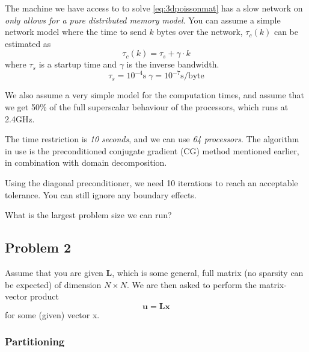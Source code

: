 \begin{question}
  The machine we have access to to solve \eqref{eq:3dpoissonmat} has a slow network on \emph{only allows for a pure distributed memory model}. You can assume a simple network model where the time to send $k$ bytes over the network, $\tau_c(k)$ can be estimated as
  \begin{equation}
    \tau_c(k) = \tau_s + \gamma \cdot k
  \end{equation}
  where $\tau_s$ is a startup time and $\gamma$ is the inverse bandwidth.
  \[
    \tau_s = 10^{-4}\mathrm{s} \; \gamma = 10^{-7}\mathrm{s/byte}
  \]

  We also assume a very simple model for the computation times, and assume that we get 50\% of the full superscalar behaviour of the processors, which runs at 2.4GHz.

  The time restriction is \emph{10 seconds}, and we can use \emph{64 processors}. The algorithm in use is the preconditioned conjugate gradient (CG) method mentioned earlier, in combination with domain decomposition.

  Using the diagonal preconditioner, we need 10 iterations to reach an acceptable tolerance. You can still ignore any boundary effects.

  What is the largest problem size we can run?
\end{question}







\clearpage
\subsection{Problem 2} %
\label{sub:problem_2}


\begin{question}
  Assume that you are given $\mathbf{L}$, which is some general, full matrix (no sparsity can be expected) of dimension $N\times N$. We are then asked to perform the matrix-vector product
  \begin{equation}
    \mathbf{u} = \mathbf{Lx}
  \end{equation}
  for some (given) vector x.
\end{question}

\subsubsection{Partitioning} %
\label{ssub:partitioning}



